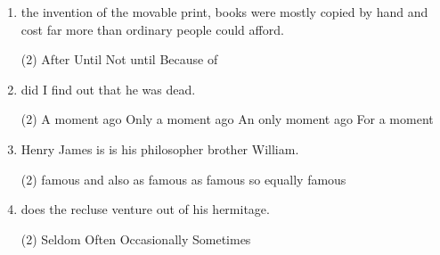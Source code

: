 \begin{enumerate}
\item \ttu the invention of the movable print, books were mostly copied by hand
  and cost far more than ordinary people could afford.
\begin{tasks}(2)
  \task After
  \task Until
  \task Not until
  \task Because of
\end{tasks}

\item \ttu did I find out that he was dead.
\begin{tasks}(2)
  \task A moment ago
  \task Only a moment ago
  \task An only moment ago
  \task For a moment
\end{tasks}

\item Henry James is \ttu is his philosopher brother William.
\begin{tasks}(2)
  \task famous and also
  \task as famous as
  \task famous so
  \task equally famous
\end{tasks}

\item \ttu does the recluse venture out of his hermitage.
\begin{tasks}(2)
  \task Seldom
  \task Often
  \task Occasionally
  \task Sometimes
\end{tasks}

\end{enumerate}

